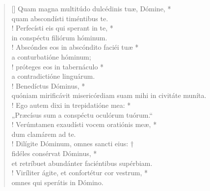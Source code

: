 \begin{verse}[\versewidth]
Quam magna multitúdo dulcédinis tuæ, Dómine, *\\
quam abscondísti timéntibus te.\\!
\vin Perfecísti eis qui sperant in te, *\\
\vin in conspéctu filiórum hóminum.\\!
Abscóndes eos in abscóndito faciéi tuæ *\\
a conturbatióne hóminum;\\!
\vin próteges eos in tabernáculo *\\
\vin a contradictióne linguárum.\\!
Benedíctus Dóminus, *\\
quóniam mirificávit misericórdiam suam mihi in civitáte muníta.\\!
\vin Ego autem dixi in trepidatióne mea: *\\
\vin „Præcísus sum a conspéctu oculórum tuórum.“\\!
Verúmtamen exaudísti vocem oratiónis meæ, *\\
dum clamárem ad te.\\!
\vin Dilígite Dóminum, omnes sancti eius: †\\
\vin fidéles consérvat Dóminus, *\\
\vin et retríbuet abundánter faciéntibus supérbiam.\\!
Viríliter ágite, et confortétur cor vestrum, *\\
omnes qui sperátis in Dómino.\\
\end{verse}
\vspace{1cm}


